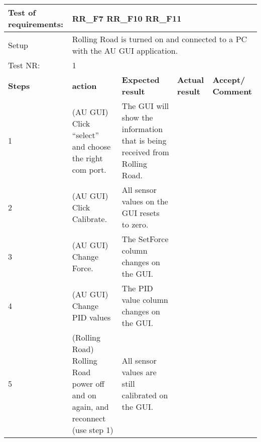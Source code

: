 \begin{table}[h!]
	\centering
	\label{my-label}	
	\begin{tabular}{|p{1.5 cm}|p{4.2 cm}|p{2.1 cm}|p{2.1 cm}|p{2.1 cm}|}
		\hline
		Test of requirements: 
		& \multicolumn{4}{l|}{RR\_F7 RR\_F10 RR\_F11} \\ \hline
		Setup 
		& \multicolumn{4}{l|}{Rolling Road is turned on and connected to a PC with the AU GUI application.} \\ \hline
		Test NR:
		& \multicolumn{4}{l|}{1} \\ \hline
		\textbf{Steps} & \textbf{action} & \textbf{Expected result} & 
		\textbf{Actual result} & \textbf{Accept/ Comment} \\ \hline
		1 
		& (AU GUI) Click “select” and choose the right com port. 
		& The GUI will show the information that is being received from Rolling Road.
		&
		& \\ \hline
		2
		& (AU GUI) Click Calibrate.
		& All sensor values on the GUI resets to zero.
		&
		& \\ \hline
		3
		& (AU GUI) Change Force.
		& The SetForce column changes on the GUI.
		&
		& \\ \hline
		4
		& (AU GUI) Change PID values
		& The PID value column changes on the GUI.
		&
		& \\ \hline
		5
		& (Rolling Road) Rolling Road power off and on again, and reconnect (use step 1)
		& All sensor values are still calibrated on the GUI.
		&
		& \\ \hline
	\end{tabular}
	\caption{}
\end{table}


